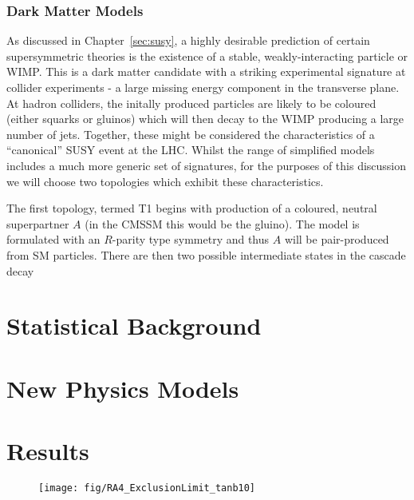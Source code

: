 
\subsubsection{Dark Matter Models}
As discussed in Chapter~\ref{sec:susy}, a highly desirable prediction of certain
supersymmetric theories is the existence of a stable, weakly-interacting
particle or \ac{WIMP}. This is a dark matter candidate with a striking
experimental signature at collider experiments - a large missing energy
component in the transverse plane. At hadron colliders, the initally produced
particles are likely to be coloured (either squarks or gluinos) which will then
decay to the \ac{WIMP} producing a large number of jets. Together, these might
be considered the characteristics of a ``canonical'' \ac{SUSY} event at the
\ac{LHC}. Whilst the range of simplified models includes a much more generic set
of signatures, for the purposes of this discussion we will choose two topologies
which exhibit these characteristics.

The first topology, termed \ac{T1} begins with production of a coloured, neutral
superpartner $A$ (in the \ac{CMSSM} this would be the gluino). The model is
formulated with an $R$-parity type symmetry and thus $A$ will be pair-produced
from \ac{SM} particles. There are then two possible intermediate states in the
cascade decay


\section{Statistical Background}

\section{New Physics Models}
\section{Results}

\begin{figure}
\texttt{[image: fig/RA4\_ExclusionLimit\_tanb10]}
\end{figure}